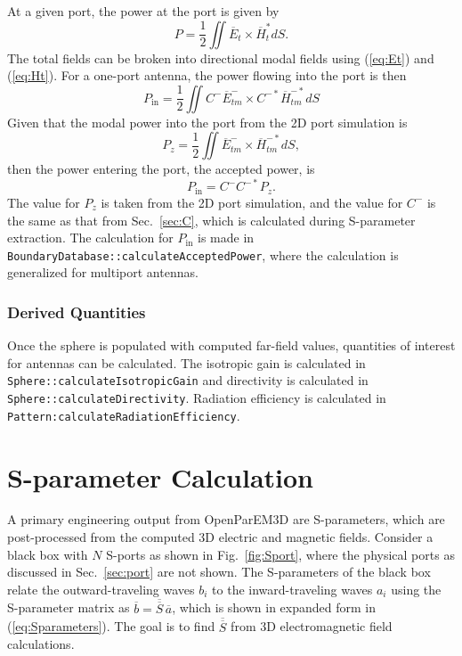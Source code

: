 \documentclass[titlepage]{article}
\renewcommand\_{\textunderscore\linebreak[1]}
\begin{document}
At a given port, the power at the port is given by
\begin{equation}
P=\frac{1}{2}\iint \overline{E}_t\times\overline{H}_t^{*} dS.
\end{equation}
The total fields can be broken into directional modal fields using (\ref{eq:Et}) and (\ref{eq:Ht}).  For a one-port antenna, the power flowing into the port is then
\begin{equation}
P_\text{in}=\frac{1}{2}\iint C^{-}\overline{E}^{-}_{tm}\times C^{-*}\overline{H}^{-*}_{tm} dS
\end{equation}
Given that the modal power into the port from the 2D port simulation is
\begin{equation}
P_{z}=\frac{1}{2}\iint \overline{E}^{-}_{tm}\times\overline{H}^{-*}_{tm} dS,
\end{equation}
then the power entering the port, the accepted power, is
\begin{equation}
P_{\text{in}}=C^{-}C^{-*}P_z.
\end{equation}
The value for $P_z$ is taken from the 2D port simulation, and the value for $C^-$ is the same as that from Sec.~\ref{sec:C}, which is calculated during S-parameter extraction.
The calculation for $P_{\text{in}}$ is made in \newline\texttt{BoundaryDatabase::calculateAcceptedPower}, where the calculation is generalized for multiport antennas.

\subsubsection{Derived Quantities}

Once the sphere is populated with computed far-field values, quantities of interest for antennas can be calculated.  The isotropic gain is calculated in \texttt{Sphere::calculateIsotropicGain} and directivity is calculated in \texttt{Sphere::calculateDirectivity}.  Radiation efficiency is calculated in \newline\texttt{Pattern:calculateRadiationEfficiency}.

\section{S-parameter Calculation}

A primary engineering output from OpenParEM3D are S-parameters, which are post-processed from the computed 3D electric and magnetic fields.  Consider a black box with $N$ S-ports as shown in Fig.~\ref{fig:Sport}, where the physical ports as discussed in Sec.~\ref{sec:port} are not shown.  The S-parameters of the black box relate the outward-traveling waves $b_i$ to the inward-traveling waves $a_i$ using the S-parameter matrix as $\overline{b}=\overline{\overline{S}}\,\overline{a}$, which is shown in expanded form in (\ref{eq:Sparameters}).  The goal is to find $\overline{\overline{S}}$ from 3D electromagnetic field calculations.
\end{document}
